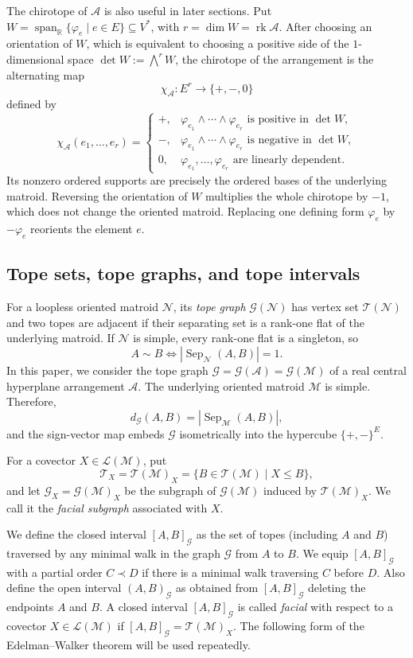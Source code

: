 \documentclass[10pt]{amsart}
\theoremstyle{plain}
\theoremstyle{definition}
\newcommand{\A}{\mathcal{A}}
\newcommand{\T}{\mathcal{T}}
\newcommand{\G}{\mathcal{G}}
\newcommand{\M}{\mathcal{M}}
\newcommand{\N}{\mathcal{N}}
\newcommand{\Lcov}{\mathcal{L}}
\newcommand{\Sep}{\operatorname{Sep}}
\newcommand{\rk}{\operatorname{rk}}
\begin{document}
The chirotope of $\A$ is also useful in later sections. Put $W=\operatorname{span}_{\mathbb R}\{\varphi_e\mid e\in E\}\subseteq V^*$, with $r=\dim W=\rk\A$. After choosing an orientation of $W$, which is equivalent to choosing a positive side of the $1$-dimensional space $\det W:=\bigwedge^r W$, the chirotope of the arrangement is the alternating map
\[
\chi_{\A}:E^r\to \{+,-,0\}
\]
defined by
\[
\chi_{\A}(e_1,\ldots,e_r)=\begin{cases}
 +, & \varphi_{e_1}\wedge\cdots\wedge\varphi_{e_r}\text{ is positive in }\det W,\\
 -, & \varphi_{e_1}\wedge\cdots\wedge\varphi_{e_r}\text{ is negative in }\det W,\\
 0, & \varphi_{e_1},\ldots,\varphi_{e_r}\text{ are linearly dependent}.
 \end{cases}
\]
Its nonzero ordered supports are precisely the ordered bases of the underlying matroid. Reversing the orientation of $W$ multiplies the whole chirotope by $-1$, which does not change the oriented matroid. Replacing one defining form $\varphi_e$ by $-\varphi_e$ reorients the element $e$.

\subsection{Tope sets, tope graphs, and tope intervals}

For a loopless oriented matroid $\N$, its \emph{tope graph} $\G(\N)$ has vertex set $\T(\N)$ and two topes are adjacent if their separating set is a rank-one flat of the underlying matroid. If $\N$ is simple, every rank-one flat is a singleton, so
\[
A\sim B\iff|\Sep_\N(A,B)|=1.
\]
In this paper, we consider the tope graph $\G=\G(\A)=\G(\M)$ of a real central hyperplane arrangement $\A$. The underlying oriented matroid $\M$ is simple. Therefore,
\[
d_{\G}(A,B)=|\Sep_\M(A,B)|,
\]
and the sign-vector map embeds $\G$ isometrically into the hypercube $\{+,-\}^E$.

For a covector $X\in\Lcov(\M)$, put
\[
\T_X=\T(\M)_X=\{B\in\T(\M)\mid X\leq B\},
\]
and let $\G_X=\G(\M)_X$ be the subgraph of $\G(\M)$ induced by $\T(\M)_X$. We call it the \emph{facial subgraph} associated with $X$.

We define the closed interval $[A,B]_{\G}$ as the set of topes (including $A$ and $B$) traversed by any minimal walk in the graph $\G$ from $A$ to $B$. We equip $[A,B]_{\G}$ with a partial order $C\prec D$ if there is a minimal walk traversing $C$ before $D$. Also define the open interval $(A,B)_{\G}$ as obtained from $[A,B]_{\G}$ deleting the endpoints $A$ and $B$. A closed interval $[A,B]_{\G}$ is called \emph{facial} with respect to a covector $X\in\Lcov(\M)$ if $[A,B]_{\G}=\T(\M)_X$. The following form of the Edelman--Walker theorem will be used repeatedly.
\end{document}
